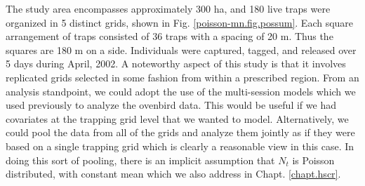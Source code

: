 The study area encompasses approximately 300 ha, and 180 live traps
were
organized in 5 distinct grids, shown in  Fig. \ref{poisson-mn.fig.possum}.
Each square arrangement of traps consisted of
36 traps with a spacing of 20 m. Thus the squares are 180 m on a
side.
Individuals were captured, tagged, and released over 5 days during
April, 2002.
A noteworthy aspect of this study is that it involves replicated
grids selected in some fashion
from within a prescribed region.
From an analysis standpoint, we could adopt the use of the
multi-session models which we used previously to analyze the ovenbird
data. This would be useful if we had covariates at the trapping grid
level that we wanted to model.   Alternatively, we could pool the data
from all of the grids and analyze them jointly as if they were based
on a single trapping grid which is clearly a reasonable view in this case.
In doing this sort of pooling, there is
an implicit assumption that $N_{t}$ is Poisson distributed, with
constant mean \citep{royle:2004abc, royle_etal:2012arXiv} which we also
address in Chapt. \ref{chapt.hscr}.


